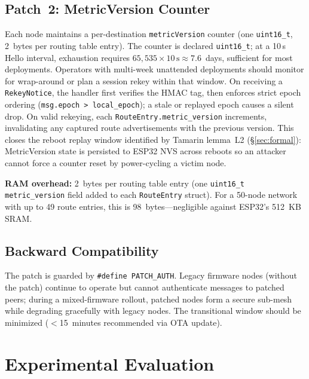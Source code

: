 \documentclass[preprint,12pt]{elsarticle}
\begin{document}
\subsection{Patch~2: MetricVersion Counter}

Each node maintains a per-destination \texttt{metricVersion}
counter (one \texttt{uint16\_t}, 2~bytes per routing table entry).
The counter is declared \texttt{uint16\_t}; at a 10\,s Hello interval,
exhaustion requires $65{,}535 \times 10\,\text{s} \approx 7.6$~days,
sufficient for most deployments.
Operators with multi-week unattended deployments should monitor
for wrap-around or plan a session rekey within that window.
On receiving a \texttt{RekeyNotice}, the handler first verifies
the HMAC tag, then enforces strict epoch ordering
(\texttt{msg.epoch > local\_epoch}); a stale or replayed epoch
causes a silent drop.
On valid rekeying, each \texttt{RouteEntry.metric\_version}
increments, invalidating any captured route advertisements
with the previous version.
This closes the reboot replay window identified by Tamarin
lemma~L2 (\S\ref{sec:formal}): MetricVersion state is persisted
to ESP32 NVS across reboots so an attacker cannot force a
counter reset by power-cycling a victim node.

\textbf{RAM overhead:} 2~bytes per routing table entry
(one \texttt{uint16\_t metric\_version} field added to each
\texttt{RouteEntry} struct).
For a 50-node network with up to 49 route entries, this is
98~bytes—negligible against ESP32's 512~KB SRAM.

\subsection{Backward Compatibility}

The patch is guarded by \texttt{\#define PATCH\_AUTH}.
Legacy firmware nodes (without the patch) continue to operate
but cannot authenticate messages to patched peers; during a
mixed-firmware rollout, patched nodes form a secure sub-mesh
while degrading gracefully with legacy nodes. The
transitional window should be minimized ($<$15~minutes
recommended via OTA update).

\section{Experimental Evaluation}
\label{sec:eval}
\end{document}

